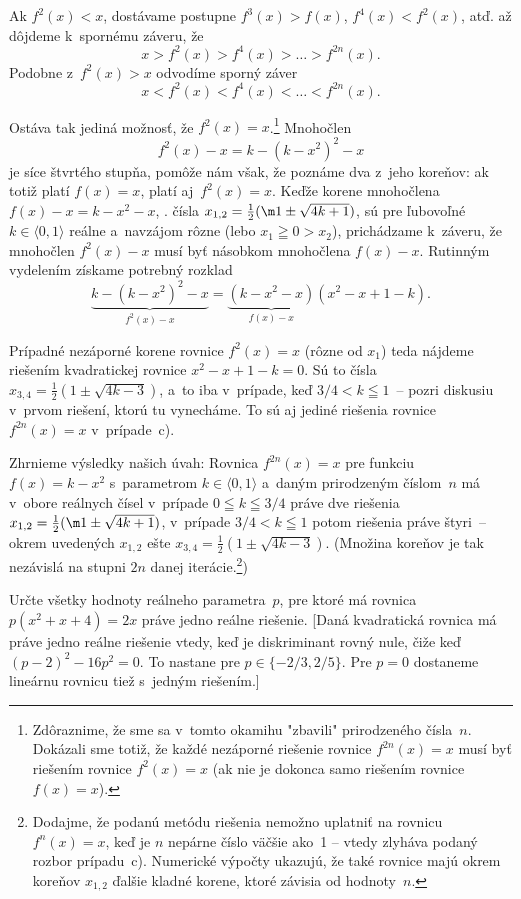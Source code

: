 {Ak $f^2(x)<x$, dostávame postupne $f^3(x)>f(x)$,
$f^4(x)<f^2(x)$, atď. až dôjdeme k~spornému záveru, že
$$
x>f^2(x)>f^4(x)>\dots>f^{2n}(x).
$$
Podobne z~$f^2(x)>x$ odvodíme sporný záver
$$
x<f^2(x)<f^4(x)<\dots<f^{2n}(x).
$$

Ostáva tak jediná možnosť, že
$f^2(x)=x$.\footnote{Zdôraznime, že sme sa v~tomto okamihu
"zbavili" prirodzeného čísla~$n$. Dokázali sme totiž, že každé
nezáporné riešenie rovnice $f^{2n}(x)=x$ musí byť riešením rovnice
$f^2(x)=x$ (ak nie je dokonca samo riešením rovnice $f(x)=x$).}
Mnohočlen $$f^2 (x)-x=k-({k-x^2})^2-x$$ je síce štvrtého stupňa,
pomôže nám však, že poznáme dva z~jeho koreňov: ak totiž platí $f(x)=x$,
platí aj~$f^2 (x)=x$. Keďže korene mnohočlena $f(x)-x=k-x^2-x$,
\tj. čísla $x_{1,2}=\frac12(\m1\pm\sqrt{4k+1})$, sú pre ľubovoľné
$k\in\langle0,1\rangle$ reálne a~navzájom rôzne
(lebo $x_1\geqq0>x_2$), prichádzame k~záveru, že mnohočlen $f^2(x)-x$ musí byť
násobkom mnohočlena $f(x)-x$. Rutinným vydelením
získame potrebný rozklad
$$
\underbrace{k-(k-x^2)^2-x}_{f^2(x)-x}=
\underbrace{(k-x^2-x)}_{f(x)-x}(x^2-x+1-k).
$$

Prípadné nezáporné korene rovnice $f^2(x)=x$ (rôzne od $x_1$) teda
nájdeme riešením kvadratickej rovnice $x^2-x+1-k=0$. Sú to čísla
$x_{3,4}=\frac12(1\pm\sqrt{4k-3})$, a~to iba v~prípade, keď
$3/4<k\leqq1$~-- pozri diskusiu v~prvom riešení, ktorú tu vynecháme.
To sú aj jediné riešenia rovnice $f^{2n}(x)=x$ v~prípade~c).

Zhrnieme výsledky našich úvah: Rovnica $f^{2n}(x)=x$ pre funkciu
$f(x)=k-x^2$ s~parametrom $k\in\langle 0, 1 \rangle$ a~daným prirodzeným číslom~$n$
má v~obore reálnych čísel v~prípade $0\leqq k\leqq3/4$
práve dve riešenia
$x_{1,2}=\frac12(\m1\pm\sqrt{4k+1})$, v~prípade $3/4<k\leqq1$ potom
riešenia práve štyri~-- okrem uvedených $x_{1,2}$ ešte
$x_{3,4}=\frac12(1\pm\sqrt{4k-3})$. (Množina koreňov je tak
nezávislá na stupni $2n$ danej iterácie.\footnote{Dodajme, že
podanú metódu riešenia nemožno uplatniť na rovnicu $f^n(x)=x$, keď je
$n$ nepárne číslo väčšie ako~1 -- vtedy zlyháva podaný rozbor prípadu~c).
Numerické výpočty ukazujú, že
také rovnice majú okrem koreňov $x_{1,2}$
ďalšie kladné korene, ktoré závisia od hodnoty~$n$.})


Určte všetky hodnoty reálneho parametra~$p$, pre ktoré má rovnica
$p(x^2+x+4) = 2x$ práve jedno reálne riešenie.
[Daná kvadratická rovnica má práve jedno reálne riešenie vtedy, keď je
diskriminant rovný nule, čiže keď $(p-2)^2-16p^2 = 0$. To nastane
pre $p \in \{-2/3, 2/5\}$. Pre $p=0$ dostaneme lineárnu rovnicu
tiež s~jedným riešením.]

}
